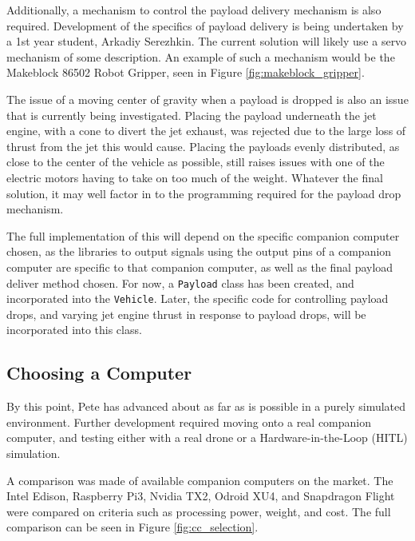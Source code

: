 \documentclass[11pt]{article}
\begin{document}
Additionally, a mechanism to control the payload delivery mechanism is also required. Development of the specifics of payload delivery is being undertaken by a 1st year student, Arkadiy Serezhkin. The current solution will likely use a servo mechanism of some description. An example of such a mechanism would be the Makeblock 86502 Robot Gripper\cite{Makeblock_gripper}, seen in Figure \ref{fig:makeblock_gripper}.

The issue of a moving center of gravity when a payload is dropped is also an issue that is currently being investigated. Placing the payload underneath the jet engine, with a cone to divert the jet exhaust, was rejected due to the large loss of thrust from the jet this would cause. Placing the payloads evenly distributed, as close to the center of the vehicle as possible, still raises issues with one of the electric motors having to take on too much of the weight. Whatever the final solution, it may well factor in to the programming required for the payload drop mechanism. \label{payload_delivery}

The full implementation of this will depend on the specific companion computer chosen, as the libraries to output signals using the output pins of a companion computer are specific to that companion computer, as well as the final payload deliver method chosen. For now, a \lstinline|Payload| class has been created, and incorporated into the \lstinline|Vehicle|. Later, the specific code for controlling payload drops, and varying jet engine thrust in response to payload drops, will be incorporated into this class.

\subsection{Choosing a Computer} \label{cc_selection}
By this point, Pete has advanced about as far as is possible in a purely simulated environment. Further development required moving onto a real companion computer, and testing either with a real drone or a Hardware-in-the-Loop (HITL) simulation.

A comparison was made of available companion computers on the market. The Intel Edison, Raspberry Pi3, Nvidia TX2, Odroid XU4, and Snapdragon Flight were compared on criteria such as processing power, weight, and cost. The full comparison can be seen in Figure \ref{fig:cc_selection}.
\end{document}
